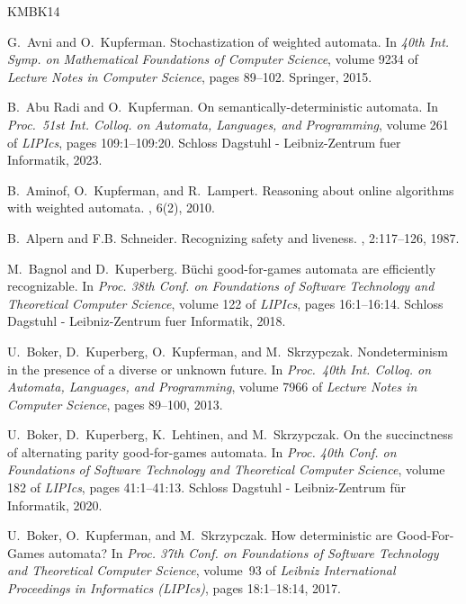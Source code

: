 \documentclass[10pt,a4paper]{amsart}
\theoremstyle{definition}
\numberwithin{equation}{section}
\begin{document}
\newcommand{\etalchar}[1]{$^{#1}$}
\begin{thebibliography}{KMBK14}

G.~Avni and O.~Kupferman.
\newblock Stochastization of weighted automata.
\newblock In {\em 40th Int. Symp. on Mathematical Foundations of Computer
  Science}, volume 9234 of {\em Lecture Notes in Computer Science}, pages
  89--102. Springer, 2015.

B.~{Abu Radi} and O.~Kupferman.
\newblock On semantically-deterministic automata.
\newblock In {\em Proc.\ 51st Int. Colloq. on Automata, Languages, and
  Programming}, volume 261 of {\em LIPIcs}, pages 109:1--109:20. Schloss
  Dagstuhl - Leibniz-Zentrum fuer Informatik, 2023.

B.~Aminof, O.~Kupferman, and R.~Lampert.
\newblock Reasoning about online algorithms with weighted automata.
, 6(2), 2010.

B.~Alpern and F.B. Schneider.
\newblock Recognizing safety and liveness.
, 2:117--126, 1987.

M.~Bagnol and D.~Kuperberg.
\newblock B{\"{u}}chi good-for-games automata are efficiently recognizable.
\newblock In {\em Proc. 38th Conf. on Foundations of Software Technology and
  Theoretical Computer Science}, volume 122 of {\em LIPIcs}, pages 16:1--16:14.
  Schloss Dagstuhl - Leibniz-Zentrum fuer Informatik, 2018.

U.~Boker, D.~Kuperberg, O.~Kupferman, and M.~Skrzypczak.
\newblock Nondeterminism in the presence of a diverse or unknown future.
\newblock In {\em Proc.\ 40th Int. Colloq. on Automata, Languages, and
  Programming}, volume 7966 of {\em Lecture Notes in Computer Science}, pages
  89--100, 2013.

U.~Boker, D.~Kuperberg, K.~Lehtinen, and M.~Skrzypczak.
\newblock On the succinctness of alternating parity good-for-games automata.
\newblock In {\em Proc. 40th Conf. on Foundations of Software Technology and
  Theoretical Computer Science}, volume 182 of {\em LIPIcs}, pages 41:1--41:13.
  Schloss Dagstuhl - Leibniz-Zentrum f{\"{u}}r Informatik, 2020.

U.~Boker, O.~Kupferman, and M.~Skrzypczak.
\newblock How deterministic are {G}ood-{F}or-{G}ames automata?
\newblock In {\em Proc. 37th Conf. on Foundations of Software Technology and
  Theoretical Computer Science}, volume~93 of {\em Leibniz International
  Proceedings in Informatics (LIPIcs)}, pages 18:1--18:14, 2017.


\end{thebibliography}
\end{document}
